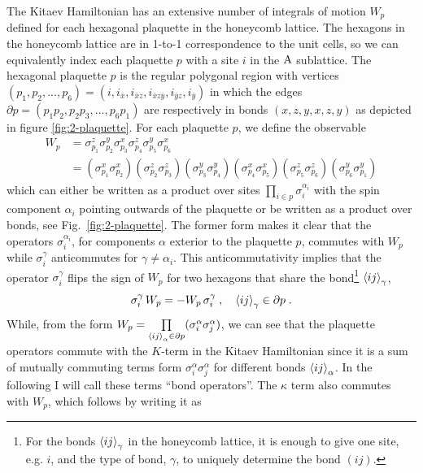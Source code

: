 The Kitaev Hamiltonian has an extensive number of integrals of motion $W_p$ defined for each hexagonal plaquette in the honeycomb lattice. The hexagons in the honeycomb lattice are in 1-to-1 correspondence to the unit cells, so we can equivalently index each plaquette $p$ with a site $i$ in the $\mathrm{A}$ sublattice. The hexagonal plaquette $p$ is the regular polygonal region with vertices $(p_1, p_2, ...,p_6)=\left( i, i_{\bar x},i_{\bar x z}, i_{\bar x z \bar y} , i_{\bar y z}, i_{\bar y} \right)$ in which the edges $\partial p = (p_1p_2,p_2p_3,...,p_6p_1)$ are respectively in bonds $(x,z,y,x,z,y)$ as depicted in figure \ref{fig:2-plaquette}.
For each plaquette $p$, we define the observable
\begin{equation}
\begin{split}
    W_p
    &=
    \sigma_{p_1}^z \sigma_{p_2}^y \sigma_{p_3}^x \sigma_{p_4}^z \sigma_{p_5}^y \sigma_{p_6}^x
    \\[6pt]
    &=
    (\sigma_{p_1}^x \sigma_{p_2}^x)
    (\sigma_{p_2}^z \sigma_{p_3}^z)
    (\sigma_{p_3}^y \sigma_{p_4}^y)
    (\sigma_{p_4}^x \sigma_{p_5}^x)
    (\sigma_{p_5}^z \sigma_{p_6}^z )
    (\sigma_{p_6}^y \sigma_{p_1}^y )
\end{split}
\end{equation}
which can either be written as a product over sites $\prod_{i\in p}\sigma_i^{\alpha_i}$ with the spin component $\alpha_i$ pointing outwards of the plaquette or be written as a product over bonds, see Fig.~\ref{fig:2-plaquette}.
The former form makes it clear that the operators $\sigma_i^{\alpha_i}$, for components $\alpha$ exterior to the plaquette $p$, commutes with $W_p$ while $\sigma_i^{\gamma}$ anticommutes for $\gamma\neq \alpha_i$. This anticommutativity implies that the operator $\sigma_i^{\gamma}$ flips the sign of $W_p$ for two hexagons that share the bond\footnote{For the bonds $\braket{ij}_\gamma$ in the honeycomb lattice, it is enough to give one site, e.g. $i$, and the type of bond, $\gamma$, to uniquely determine the bond $(ij)$. } $\braket{ij}_\gamma$,
\begin{equation}
    \sigma_i^{\gamma} \, W_p = -  W_p \, \sigma_i^{\gamma} \; , \quad \braket{ij}_\gamma \in \partial p \; . \label{eq:flux}
\end{equation}
While, from the form $W_p = \prod\limits_{\braket{ij}_{\alpha} \in \partial p} (\sigma_{i}^\alpha \sigma_{j}^\alpha)$, we can see that the plaquette operators commute with the $K$-term in the Kitaev Hamiltonian since it is a sum of mutually commuting terms form $\sigma_{i}^\alpha \sigma_{j}^\alpha$ for different bonds $\braket{ij}_\alpha$.  In the following I will call these terms ``bond operators''.  The $\kappa$ term also commutes with $W_p$, which follows by writing it as

